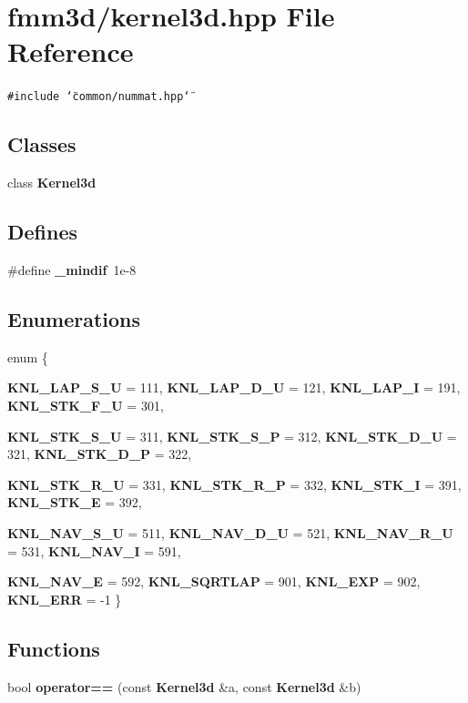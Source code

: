 \section{fmm3d/kernel3d.hpp File Reference}
\label{kernel3d_8hpp}


{\tt \#include \char`\"{}common/nummat.hpp\char`\"{}}\par
\subsection*{Classes}
\begin{CompactItemize}
\item 
class {\bf Kernel3d}
\end{CompactItemize}
\subsection*{Defines}
\begin{CompactItemize}
\item 
\#define {\bf \_\-mindif}~1e-8
\end{CompactItemize}
\subsection*{Enumerations}
\begin{CompactItemize}
\item 
enum \{ \par
{\bf KNL\_\-LAP\_\-S\_\-U} =  111, 
{\bf KNL\_\-LAP\_\-D\_\-U} =  121, 
{\bf KNL\_\-LAP\_\-I} =  191, 
{\bf KNL\_\-STK\_\-F\_\-U} =  301, 
\par
{\bf KNL\_\-STK\_\-S\_\-U} =  311, 
{\bf KNL\_\-STK\_\-S\_\-P} =  312, 
{\bf KNL\_\-STK\_\-D\_\-U} =  321, 
{\bf KNL\_\-STK\_\-D\_\-P} =  322, 
\par
{\bf KNL\_\-STK\_\-R\_\-U} =  331, 
{\bf KNL\_\-STK\_\-R\_\-P} =  332, 
{\bf KNL\_\-STK\_\-I} =  391, 
{\bf KNL\_\-STK\_\-E} =  392, 
\par
{\bf KNL\_\-NAV\_\-S\_\-U} =  511, 
{\bf KNL\_\-NAV\_\-D\_\-U} =  521, 
{\bf KNL\_\-NAV\_\-R\_\-U} =  531, 
{\bf KNL\_\-NAV\_\-I} =  591, 
\par
{\bf KNL\_\-NAV\_\-E} =  592, 
{\bf KNL\_\-SQRTLAP} =  901, 
{\bf KNL\_\-EXP} =  902, 
{\bf KNL\_\-ERR} =  -1
 \}
\end{CompactItemize}
\subsection*{Functions}
\begin{CompactItemize}
\item 
bool {\bf operator==} (const {\bf Kernel3d} \&a, const {\bf Kernel3d} \&b)
\end{CompactItemize}


